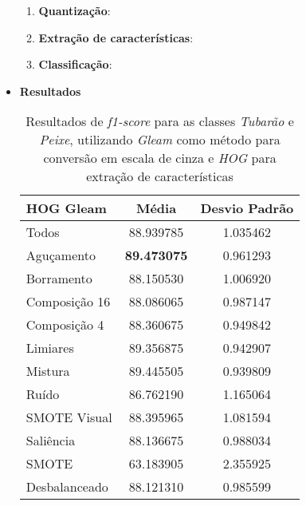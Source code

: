 \begin{itemize}
\begin{enumerate}
\item \textbf{Quantização}:
\item \textbf{Extração de características}:
\item \textbf{Classificação}:
\end{enumerate}
\item[] \textbf{Resultados}

%
\begin{minipage}{\linewidth}
\begin{table}[H]
\begin{center}
\caption{Resultados de \textit{f1-score} para as classes \emph{Tubarão} e \emph{Peixe}, utilizando \emph{Gleam} como método para conversão em escala de cinza e \emph{HOG} para extração de características}
\label{tab:resultados:5:melhor}
\begin{tabular}{|l|c|c|}
\hline
\textbf{HOG Gleam} & \textbf{Média}     & \textbf{Desvio Padrão} \\ \hline
   Todos        &  88.939785 &  1.035462  \\ \hline
  Aguçamento    &  \textbf{89.473075} &  0.961293  \\ \hline
  Borramento    &  88.150530 &  1.006920  \\ \hline
  Composição 16 &  88.086065 &  0.987147  \\ \hline
  Composição 4  &  88.360675 &  0.949842  \\ \hline
  Limiares      &  89.356875 &  0.942907  \\ \hline
  Mistura       &  89.445505 &  0.939809  \\ \hline
  Ruído         &  86.762190 &  1.165064  \\ \hline
  SMOTE Visual  &  88.395965 &  1.081594  \\ \hline
  Saliência     &  88.136675 &  0.988034  \\ \hline
 SMOTE          &  63.183905 &  2.355925  \\ \hline
Desbalanceado   &  88.121310 &  0.985599  \\ \hline
\end{tabular}
\end{center}
\end{table}
\end{minipage}


\end{itemize}
